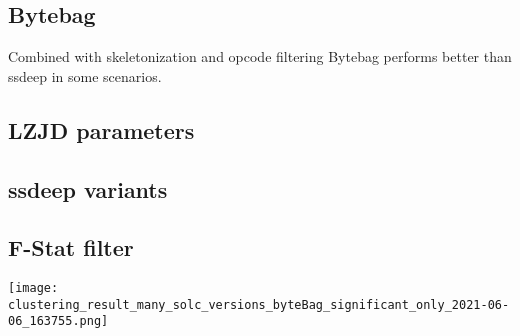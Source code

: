 \documentclass[../main.tex]{subfiles}
\begin{document}

\subsection{Bytebag}
Combined with skeletonization and opcode filtering Bytebag performs better than ssdeep in some scenarios.

\subsection{LZJD parameters}



\subsection{ssdeep variants}

\subsection{F-Stat filter}

\texttt{[image: clustering\_result\_many\_solc\_versions\_byteBag\_significant\_only\_2021-06-06\_163755.png]}
\end{document}
